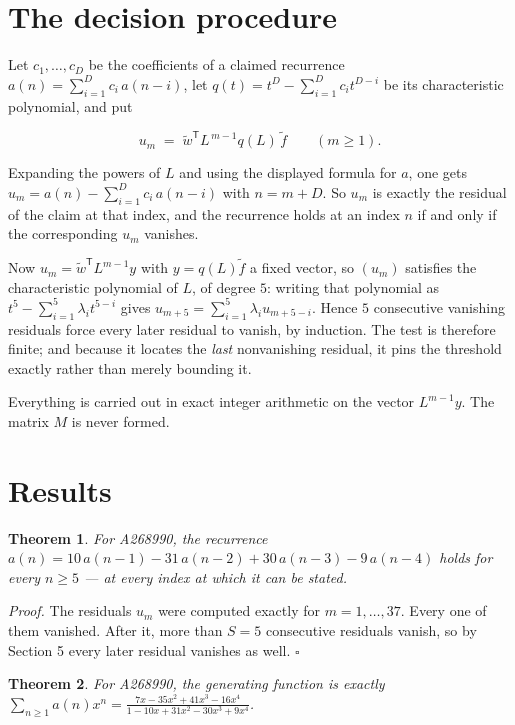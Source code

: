 \documentclass[11pt]{article}
\newtheorem{theorem}{Theorem}
\theoremstyle{definition}
\begin{document}
\section{The decision procedure}

Let $c_1,\dots,c_D$ be the coefficients of a claimed recurrence $a(n) = \sum_{i=1}^{D} c_i\,a(n-i)$, let $q(t) = t^{D} - \sum_{i=1}^{D} c_i t^{D-i}$ be its characteristic polynomial, and put

\[u_m \;=\; \tilde w^{\mathsf T} L^{\,m-1} q(L)\,\tilde f \qquad (m \ge 1).\]

Expanding the powers of $L$ and using the displayed formula for $a$, one gets $u_m = a(n) - \sum_{i=1}^{D} c_i\,a(n-i)$ with $n = m + D$. So $u_m$ is exactly the residual of the claim at that index, and the recurrence holds at an index $n$ if and only if the corresponding $u_m$ vanishes.

Now $u_m = \tilde w^{\mathsf T} L^{m-1} y$ with $y = q(L)\tilde f$ a fixed vector, so $(u_m)$ satisfies the characteristic polynomial of $L$, of degree $5$: writing that polynomial as $t^{5} - \sum_{i=1}^{5} \lambda_i t^{5-i}$ gives $u_{m+5} = \sum_{i=1}^{5} \lambda_i u_{m+5-i}$. Hence $5$ consecutive vanishing residuals force every later residual to vanish, by induction. The test is therefore finite; and because it locates the {\itshape last} nonvanishing residual, it pins the threshold exactly rather than merely bounding it.

Everything is carried out in exact integer arithmetic on the vector $L^{m-1}y$. The matrix $M$ is never formed.

\section{Results}

\begin{theorem} For A268990, the recurrence $a(n) = 10\,a(n-1) - 31\,a(n-2) + 30\,a(n-3) - 9\,a(n-4)$ holds for every $n \ge 5$ --- at every index at which it can be stated.\end{theorem}

{\itshape Proof.} The residuals $u_m$ were computed exactly for $m = 1,\dots,37$. Every one of them vanished. After it, more than $S = 5$ consecutive residuals vanish, so by Section 5 every later residual vanishes as well. $\square$

\begin{theorem} For A268990, the generating function is exactly $\sum_{n\ge 1} a(n)x^n = \frac{7x - 35x^{2} + 41x^{3} - 16x^{4}}{1 - 10x + 31x^{2} - 30x^{3} + 9x^{4}}$.\end{theorem}
\end{document}
